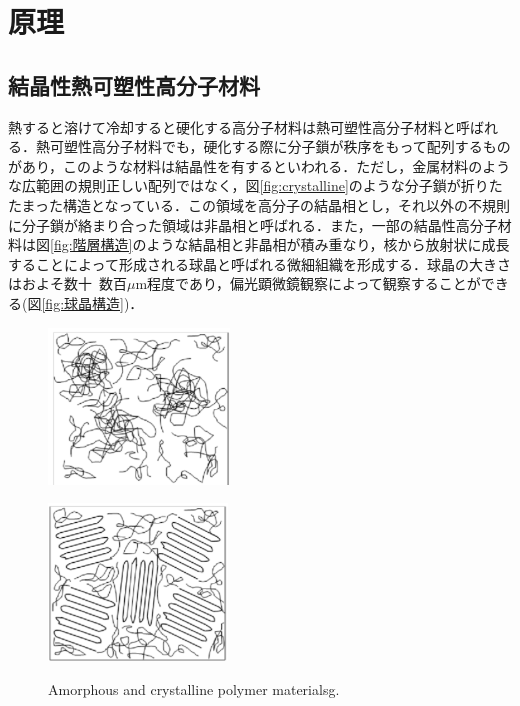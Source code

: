 \section{原理}

\subsection{結晶性熱可塑性高分子材料}
熱すると溶けて冷却すると硬化する高分子材料は熱可塑性高分子材料と呼ばれる．熱可塑性高分子材料でも，硬化する際に分子鎖が秩序をもって配列するものがあり，このような材料は結晶性を有するといわれる．ただし，金属材料のような広範囲の規則正しい配列ではなく，図\ref{fig:crystalline}のような分子鎖が折りたたまった構造となっている．この領域を高分子の結晶相とし，それ以外の不規則に分子鎖が絡まり合った領域は非晶相と呼ばれる．また，一部の結晶性高分子材料は図\ref{fig:階層構造}のような結晶相と非晶相が積み重なり，核から放射状に成長することによって形成される球晶と呼ばれる微細組織を形成する．球晶の大きさはおよそ数十~数百$\mu$m程度であり，偏光顕微鏡観察によって観察することができる(図\ref{fig:球晶構造})．

\begin{figure}[htbp]
    \begin{minipage}[htbp]{0.45\linewidth}
      \centering
      \includegraphics[keepaspectratio, scale=1]{fig/fig_amorphous.png}
      \label{fig:amorphous}
    \end{minipage}
    \begin{minipage}[htbp]{0.45\linewidth}
      \centering
      \includegraphics[keepaspectratio, scale=1]{fig/fig_crystalline.png}
      \label{fig:crystalline}
    \end{minipage}
    \centering
    \caption{Amorphous and crystalline polymer materialsg.}
    \label{fig:amorphous_crystalline}
\end{figure}

